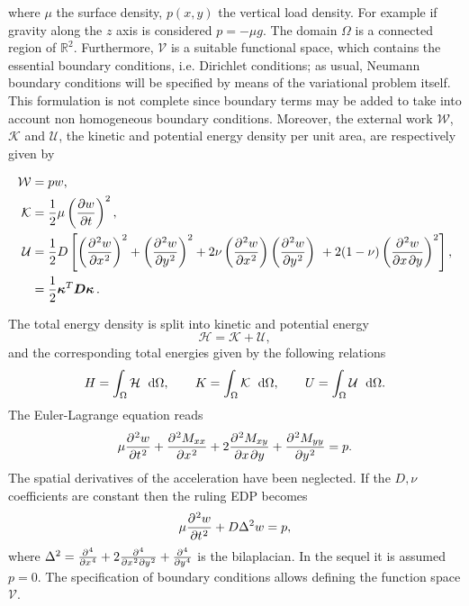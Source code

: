 \documentclass[preprint,12pt]{elsarticle}
\newcommand{\matr}[1]{\bm{#1}}
\begin{document}
	where $\mu$ the surface density, $p(x,y)$ the vertical load density. For example if gravity along the $z$ axis is considered $p = -\mu g$. The domain $\Omega$ is a connected region of $\mathbb{R}^2$. Furthermore, $\mathcal{V}$ is a suitable functional space, which contains the essential boundary conditions, i.e. Dirichlet conditions; as usual, Neumann boundary conditions will be specified by means of the variational problem itself. This formulation is not complete since boundary terms may be added to take into account non homogeneous boundary conditions. Moreover, the external work $\mathcal{W}$, $\mathcal{K}$ and $\mathcal{U}$, the kinetic and potential energy density per unit area, are respectively given by
	
	\begin{align*}
	\mathcal{W} &= pw, \\
	\mathcal{K} &= \frac{1}{2} \mu \left(\diffp{w}{t}\right)^2,\\
	\mathcal{U} &= \frac{1}{2} D \left[ \left(\diffp[2]{w}{x} \right)^2 + \left(\diffp[2]{w}{y}\right)^2 
	+ 2\nu \left(\diffp[2]{w}{x}\right) \left(\diffp[2]{w}{y}\right)  \  + 2 (1 - \nu) \left(\diffp{w}{x,y}\right)^2 \right], \\
	&= \frac{1}{2} \bm{\kappa}^T \matr{D} \bm{\kappa} \, .	
	\end{align*} 
	
	The total energy density is split into kinetic and potential energy
	\begin{equation}
	\mathcal{H} = \mathcal{K} + \mathcal{U},
	\end{equation}
	and the corresponding total energies given by the following relations
	\begin{equation}
	H = \int_{\Omega} \mathcal{H} \ \d{\Omega}, \qquad K = \int_{\Omega} \mathcal{K} \ \d{\Omega}, \qquad U = \int_{\Omega} \mathcal{U} \ \d{\Omega}.
	\end{equation}
	The Euler-Lagrange equation reads
	\begin{equation}
	\mu \diffp[2]{w}{t}  + \diffp[2]{M_{xx}}{x} + 2 \diffp{M_{xy}}{x,y} + \diffp[2]{M_{yy}}{y}= p.
	\end{equation}
	The spatial derivatives of the acceleration have been neglected. If the $D, \nu$ coefficients are constant then the ruling EDP becomes
	\begin{equation}
	\mu \diffp[2]{w}{t}  + D \Delta^2 w= p ,
	\end{equation}
	where $\Delta^2 = \diffp[4]{}{x} + 2 \diffp[2,2]{}{x,y} + \diffp[4]{}{y}$ is the bilaplacian. In the sequel it is assumed $p =0$.
	The specification of boundary conditions allows defining the function space $\mathcal{V}$. 
	
\end{document}
